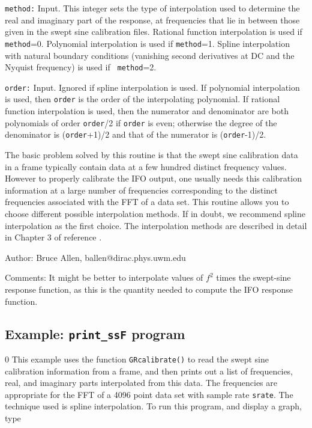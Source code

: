 \begin{description}
\item{\tt method:} Input.  This integer sets the type of interpolation
  used to determine the real and imaginary part of the response, at
  frequencies that lie in between those given in the swept sine
  calibration files.  Rational function interpolation is used if {\tt
  method}=0.  Polynomial interpolation is used if {\tt method}=1.
  Spline interpolation with natural boundary conditions (vanishing
  second derivatives at DC and the Nyquist frequency) is used if {\tt
  method}=2.
\item{\tt order:}  Input.  Ignored if spline interpolation is used.
  If polynomial interpolation is used, then {\tt order} is the order
  of the interpolating polynomial.
  If rational function interpolation is used, then the numerator and
  denominator are both polynomials of order {\tt order}/2 if {\tt order}
  is even; otherwise the degree of the denominator is ({\tt order}+1)/2
  and that of the numerator is ({\tt order}-1)/2.
\end{description}

The basic problem solved by this routine is that the swept sine
calibration data in a frame typically contain data at a few hundred
distinct frequency values.   However to properly calibrate the IFO output,
one usually needs this calibration information at a large number of
frequencies corresponding to the distinct frequencies associated with the
FFT of a data set.  This routine allows you to choose different possible
interpolation methods.  If in doubt, we recommend spline interpolation
as the first choice.  The interpolation methods are described in detail
in Chapter 3 of reference \cite{NumRec}.
\begin{description}
\item{Author:}  Bruce Allen, ballen@dirac.phys.uwm.edu
\item{Comments:}  It might be better to interpolate values of
$f^2$ times the swept-sine response function, as this is the quantity
needed to compute the IFO response function.
\end{description}
\clearpage

\subsection{Example: {\tt print\_ssF} program}
\label{ss:print_ssF}
\setcounter{equation}0
This example uses the function {\tt GRcalibrate()} to read the swept
sine calibration information from a frame, and then prints out a list
of frequencies, real, and imaginary parts interpolated from this data.
The frequencies are appropriate for the FFT of a 4096 point data set with
sample rate {\tt srate}.   The technique used is spline interpolation.
To run this program, and display a graph, type\\
\\
\\
\\

